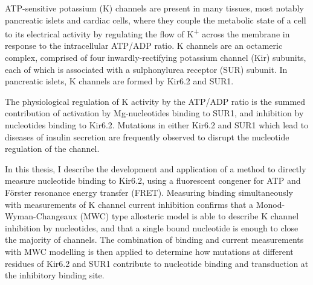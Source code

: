 ATP-sensitive potassium (K\ATP{}) channels are present in many tissues, most notably pancreatic islets and cardiac cells, where they couple the metabolic state of a cell to its electrical activity by regulating the flow of K\textsuperscript{+} across the membrane in response to the intracellular ATP/ADP ratio.
K\ATP{} channels are an octameric complex, comprised of four inwardly-rectifying potassium channel (Kir) subunits, each of which is associated with a sulphonylurea receptor (SUR) subunit. 
In pancreatic islets, K\ATP{} channels are formed by Kir6.2 and SUR1.

The physiological regulation of K\ATP{} activity by the ATP/ADP ratio is the summed contribution of activation by Mg-nucleotides binding to SUR1, and inhibition by nucleotides binding to Kir6.2.
Mutations in either Kir6.2 and SUR1 which lead to diseases of insulin secretion are frequently observed to disrupt the nucleotide regulation of the channel.

In this thesis, I describe the development and application of a method to directly measure nucleotide binding to Kir6.2, using a fluorescent congener for ATP and F\"{o}rster resonance energy transfer (FRET).
Measuring binding simultaneously with measurements of K\ATP{} channel current inhibition confirms that a Monod-Wyman-Changeaux (MWC) type allosteric model is able to describe K\ATP{} channel inhibition by nucleotides, and that a single bound nucleotide is enough to close the majority of channels.
The combination of binding and current measurements with MWC modelling is then applied to determine how mutations at different residues of Kir6.2 and SUR1 contribute to nucleotide binding and transduction at the inhibitory binding site.
